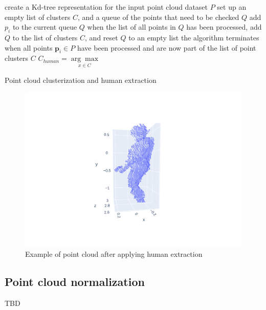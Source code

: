 \begin{algorithm}[H]
\label{alg:clusterization}
\SetAlgoLined
{}
 create a Kd-tree representation for the input point cloud dataset $P$ \;
 set up an empty list of clusters $C$, and a queue of the points that need to be checked $Q$ \;
 {
    add $p_i$ to the current queue $Q$ \;
    when the list of all points in $Q$ has been processed, add $Q$ to the list of clusters $C$, and reset $Q$ to an empty list \;
}
the algorithm terminates when all points $\boldsymbol{p}_i \in P$ have been processed and are now part of the list of point clusters $C$ \;
$C_{human} = \underset{ x \in C }{\arg\max}$

\caption{Point cloud clusterization and human extraction \parencite{noauthor_pcl_nodate}}
\end{algorithm}

\begin{figure}[htbp]
    \centerline{
            \includegraphics[trim=850 400 700 200,clip,scale=.3]{Figures/example-after-segmentation.png}
    }
    \caption{Example of point cloud after applying human extraction}
    \label{img:after-clustering}
\end{figure}

\subsection{Point cloud normalization}
TBD



